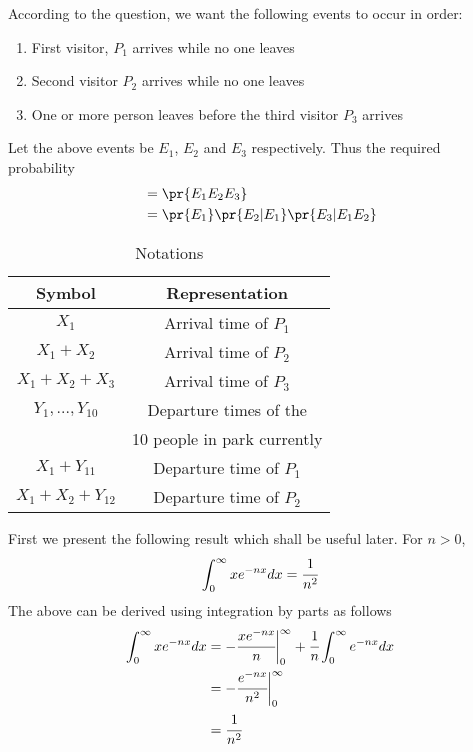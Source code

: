 
According to the question, we want the following events to occur in order: 
\begin{enumerate}
    \item First visitor, $P_1$ arrives while no one leaves
    \item Second visitor $P_2$ arrives while no one leaves
    \item One or more person leaves before the third visitor $P_3$ arrives
\end{enumerate}
Let the above events be $E_1$, $E_2$ and $E_3$ respectively. Thus the required probability
\begin{align}
    &= \pr{E_1E_2E_3}\\
    &= \pr{E_1}\pr{E_2|E_1}\pr{E_3|E_1E_2}\label{st2021-50:Requiredprobability}
\end{align}
\begin{table}
    \centering
    \begin{tabular}{|c|c|}
    \hline
    Symbol  & Representation  \\
    \hline
    $X_1$            & Arrival time of $P_1$  \\
    $X_1+X_2$        & Arrival time of $P_2$  \\
    $X_1+X_2+X_3$    & Arrival time of $P_3$  \\
    \hline
    $Y_1,...,Y_{10}$ & Departure times of the  \\
                     & 10 people in park currently\\
    \hline
    $X_1+Y_{11}$     & Departure time of $P_1$\\
    $X_1+X_2+Y_{12}$ & Departure time of $P_2$\\
    \hline
    \end{tabular}
    \caption{Notations}
    \label{st2021-50:tab:my_label}
\end{table}
First we present the following result which shall be useful later. For $n>0$,
\begin{align}
    \int_0^{\infty} xe^{-nx}dx = \cfrac{1}{n^2}\label{st2021-50:integrationresult}
\end{align}
The above can be derived using integration by parts as follows
\begin{align}
    \int_0^{\infty} xe^{-nx} dx &= -\cfrac{xe^{-nx}}{n} \biggr \vert_0^{\infty} 
                                   + \cfrac{1}{n} \int_0^{\infty}e^{-nx}dx\\
                                &= -\cfrac{e^{-nx}}{n^2}\biggr \vert_0^{\infty}\\
                                &= \cfrac{1}{n^2}
\end{align}
